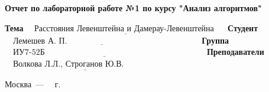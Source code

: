 \begin{titlepage}
	\begin{center}
		\Large\textbf{Отчет по лабораторной работе №1 по курсу "Анализ алгоритмов"}
	\end{center}
	
	\noindent\textbf{Тема} $\underline{\text{~~~Расстояния Левенштейна и Дамерау-Левенштейна~~~~}}$\newline\newline
	\noindent\textbf{Студент} $\underline{\text{~~~Лемешев А. П.~~~~~~~~~~~~~~~~~~~~~~~~~~~~~~~~~~~~~~~~~~~~~~~~}}$\newline\newline
	\noindent\textbf{Группа} $\underline{\text{~~~ИУ7-52Б~~~~~~~~~~~~~~~~~~~~~~~~~~~~~~~~~~~~~~~~~~~~~~~~~~~~~~~~~~}}$\newline\newline
	\noindent\textbf{Преподаватели} $\underline{\text{~~~Волкова Л.Л., Строганов Ю.В.~~~~~~~~~~~~~~~}}$\newline
	

	\begin{center}
		\vfill
		Москва~---~\the\year
		~г.
	\end{center}
 \restoregeometry
\end{titlepage}
